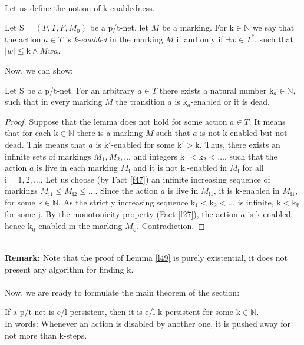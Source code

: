 \documentclass[a4paper]{llncs}
\begin{document}
\mbox{ }\\
Let us define the notion of k-enabledness.
\begin{definition}[k-enabledness]
\label{d48}
Let $\mathrm{S}=(P,T,F,M_0)$ be a p/t-net, let $M$ be a marking. For $\mathrm{k} \in \mathbb{N}$ we say that the action $a\in T$ is \emph{k-enabled} in the marking $M$ if and only if $\exists w \in T^*$, such that $|w|\leq \mathrm{k} \land Mwa$.
\end{definition}
\newpage
Now, we can show:

\begin{lemma}
\label{l49}
Let $\mathrm{S}$ be a p/t-net. For an arbitrary $a \in T$ there exists a natural number $\mathrm{k}_a\in \mathbb{N}$, such that in every marking $M$ the transition $a$ is $\mathrm{k}_a$-enabled or it is dead.
\end{lemma}
\begin{proof}
Suppose that the lemma does not hold for some action $a\in T$. It means that for each $\mathrm{k}\in\mathbb{N}$ there is a marking $M$ such that $a$ is not k-enabled but not dead. This means that $a$ is $\mathrm{k}'$-enabled for some $\mathrm{k}'>\mathrm{k}$. Thus, there exists  an infinite sets of markings $M_1, M_2,\ldots$ and integers $\mathrm{k}_1<\mathrm{k}_2<\ldots$, such that the action $a$ is live in each marking $M_\mathrm{i}$ and it is not $\mathrm{k}_\mathrm{i}$-enabled in $M_\mathrm{i}$ for all $\mathrm{i}=1,2,\ldots$.
Let us choose (by Fact \ref{f47}) an infinite increasing sequence of markings $M_{\mathrm{i}1}\leq M_{\mathrm{i}2}\leq \ldots$.
Since the action $a$ is live in $M_{\mathrm{i}1}$, it is k-enabled in $M_{\mathrm{i}1}$, for some $\mathrm{k}\in\mathbb{N}$. As the strictly increasing sequence $\mathrm{k}_1<\mathrm{k}_2<\ldots$ is infinite, $\mathrm{k}<\mathrm{k}_{\mathrm{ij}}$ for some j. By the monotonicity property (Fact \ref{f27}), the action $a$ is k-enabled, hence  $\mathrm{k}_{\mathrm{ij}}$-enabled in the marking $M_{\mathrm{ij}}$. Contradiction.	
\end{proof}
\mbox{ }\\
\textbf{Remark:} Note that the proof of Lemma \ref{l49} is purely existential, it does not present any algorithm for finding k.
\\
\\
Now, we are ready to formulate the main theorem of the section:

\begin{theorem}
\label{t410}
If a p/t-net is e/l-persistent, then it is e/l-$\mathrm{k}$-persistent for some $\mathrm{k} \in \mathbb{N}$.\\
In words: Whenever an action is disabled by another one, it is pushed away for not more than $\mathrm{k}$-steps.
\end{theorem}
\end{document}
